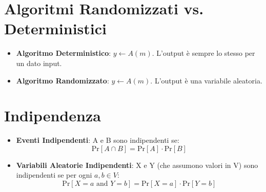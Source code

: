 \documentclass{article}
\begin{document}
\section{Algoritmi Randomizzati vs. Deterministici}
\begin{itemize}
    \item \textbf{Algoritmo Deterministico}: $y \leftarrow A(m)$. L'output è sempre lo stesso per un dato input.
    \item \textbf{Algoritmo Randomizzato}: $y \leftarrow A(m)$. L'output è una variabile aleatoria.
\end{itemize}

\section{Indipendenza}
\begin{itemize}
    \item \textbf{Eventi Indipendenti}: A e B sono indipendenti se:
    \[ \text{Pr}[A \cap B] = \text{Pr}[A] \cdot \text{Pr}[B] \]
    \item \textbf{Variabili Aleatorie Indipendenti}: X e Y (che assumono valori in V) sono indipendenti se per ogni $a,b \in V$:
    \[ \text{Pr}[X=a \text{ and } Y=b] = \text{Pr}[X=a] \cdot \text{Pr}[Y=b] \]
\end{itemize}
\end{document}
